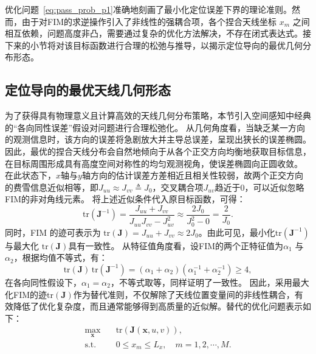 优化问题~\eqref{eq:pass_prob_p1}准确地刻画了最小化定位误差下界的理论准则。然而，由于对FIM的求逆操作引入了非线性的强耦合项，各个捏合天线坐标 $x_m$ 之间相互依赖，问题高度非凸，需要通过复杂的优化方法解决，不存在闭式表达式。接下来的小节将对该目标函数进行合理的松弛与推导，以揭示定位导向的最优几何分布形态。

\subsection{定位导向的最优天线几何形态}

为了获得具有物理意义且计算高效的天线几何分布策略，本节引入空间感知中经典的“各向同性误差”假设对问题进行合理松弛化。
从几何角度看，当缺乏某一方向的观测信息时，该方向的误差将急剧放大并主导总误差，呈现出狭长的误差椭圆。
因此，最优的捏合天线分布会自然地倾向于从各个正交方向均衡地获取目标信息，在目标周围形成具有高度空间对称性的均匀观测视角，使误差椭圆向正圆收敛。
在此状态下，$x$轴与$y$轴方向的估计误差方差相近且相关性较弱，故两个正交方向的费雪信息近似相等，即$J_{uu} \approx J_{vv} \triangleq J_0$，交叉耦合项$J_{uv}$趋近于0，可以近似忽略FIM的非对角线元素。
将上述近似条件代入原目标函数，可得：
\begin{equation}\label{eq:pass_trJ_inv_approx}
	\mathrm{tr}(\bm{J}^{-1}) = \frac{J_{uu} + J_{vv}}{J_{uu}J_{vv} - J_{uv}^2} \approx \frac{2J_0}{J_0^2 - 0} = \frac{2}{J_0}.
\end{equation}
同时，FIM 的迹可表示为 $\mathrm{tr}(\bm{J}) = J_{uu} + J_{vv} \approx 2J_0$。由此可见，最小化$\mathrm{tr}(\bm{J}^{-1})$与最大化 $\mathrm{tr}(\bm{J})$具有一致性。
从特征值角度看，设FIM的两个正特征值为$\alpha_1$ 与 $\alpha_2$，根据均值不等式，有：
\begin{equation}
	\mathrm{tr}(\bm{J})\,\mathrm{tr}(\bm{J}^{-1}) =
	(\alpha_1 + \alpha_2)(\alpha_1^{-1} + \alpha_2^{-1})\ge 4,
\end{equation}
在各向同性假设下，$\alpha_1=\alpha_2$，不等式取等，同样证明了一致性。
因此，采用最大化FIM的迹$\mathrm{tr}(\bm{J})$作为替代准则，不仅解除了天线位置变量间的非线性耦合，有效降低了优化复杂度，而且通常能够得到高质量的近似解。替代的优化问题表示如下：
\begin{equation}\label{eq:pass_prob_p2}
	\begin{aligned}
		\max_{\bm{x}} \quad & \mathrm{tr}\left( \bm{J}(\bm{x}, u, v) \right), \\
		\text{s.t.} \quad & 0 \leq x_m \leq L_x, \quad m = 1, 2, \cdots, M.
	\end{aligned}
\end{equation}

